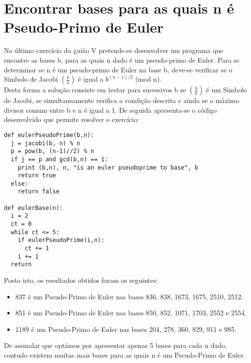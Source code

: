 \section{Encontrar bases para as quais n é Pseudo-Primo de Euler}
No último exercício do guião V pretende-se desenvolver um programa que encontre as bases b, para as quais n dado é um pseudo-primo de Euler. Para se determinar se n é um pseudo-primo  de Euler na base b, deve-se verificar se o Símbolo de Jacobi $(\frac{b}{n})$ é igual a $b^{(n-1)/2}$ (mod n). \\Desta forma a solução consiste em testar para sucessivos b se $(\frac{b}{n})$ é um Símbolo de Jacobi, se simultaneamente verifica a condição descrita e ainda se o máximo divisor comum entre b e n é igual a 1. De seguida apresenta-se o código desenvolvido que permite resolver o exercício:
\begin{lstlisting}[style=sage]
def eulerPseudoPrime(b,n):
  j = jacobi(b, n) % n
  p = pow(b, (n-1)//2) % n
  if j == p and gcd(b,n) == 1: 
    print (b,n), n, "is an euler pseudoprime to base", b
    return true
  else:
    return false

def eulerBase(n):
  i = 2
  ct = 0
  while ct <= 5:
    if eulerPseudoPrime(i,n):
      ct += 1  
    i += 1
  return
\end{lstlisting}
Posto isto, os resultados obtidos foram os seguintes:
\begin{itemize}
  \item 837 é um Pseudo-Primo de Euler nas bases 836, 838, 1673, 1675, 2510, 2512.
  \item 851 é um Pseudo-Primo de Euler nas bases 850, 852, 1071, 1703, 2552 e 2554.
  \item 1189 é um Pseudo-Primo de Euler nas bases 204, 278, 360, 829, 911 e 985. 
\end{itemize}
De assinalar que optámos por apresentar apenas 5 bases para cada n dado, contudo existem muitas mais bases para as quais n é um Pseudo-Primo de Euler.
